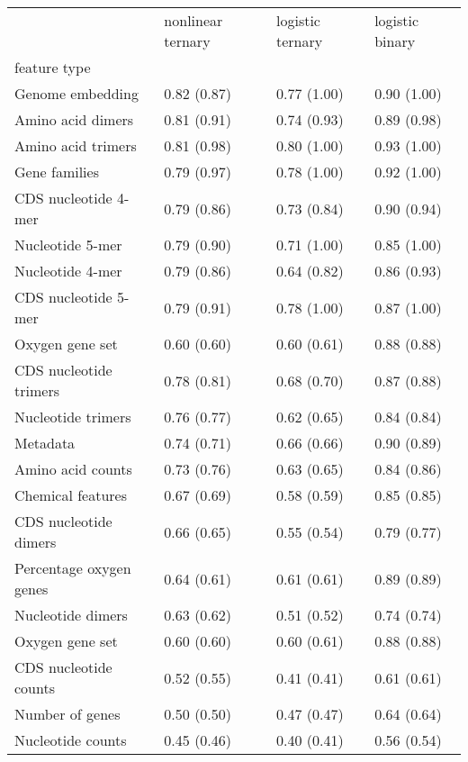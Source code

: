 \begin{tabular}{llll}
\toprule
 & nonlinear ternary & logistic ternary & logistic binary \\
feature type &  &  &  \\
\midrule
Genome embedding & 0.82 (0.87) & 0.77 (1.00) & 0.90 (1.00) \\
Amino acid dimers & 0.81 (0.91) & 0.74 (0.93) & 0.89 (0.98) \\
Amino acid trimers & 0.81 (0.98) & 0.80 (1.00) & 0.93 (1.00) \\
Gene families & 0.79 (0.97) & 0.78 (1.00) & 0.92 (1.00) \\
CDS nucleotide 4-mer & 0.79 (0.86) & 0.73 (0.84) & 0.90 (0.94) \\
Nucleotide 5-mer & 0.79 (0.90) & 0.71 (1.00) & 0.85 (1.00) \\
Nucleotide 4-mer & 0.79 (0.86) & 0.64 (0.82) & 0.86 (0.93) \\
CDS nucleotide 5-mer & 0.79 (0.91) & 0.78 (1.00) & 0.87 (1.00) \\
Oxygen gene set & 0.60 (0.60) & 0.60 (0.61) & 0.88 (0.88) \\
CDS nucleotide trimers & 0.78 (0.81) & 0.68 (0.70) & 0.87 (0.88) \\
Nucleotide trimers & 0.76 (0.77) & 0.62 (0.65) & 0.84 (0.84) \\
Metadata & 0.74 (0.71) & 0.66 (0.66) & 0.90 (0.89) \\
Amino acid counts & 0.73 (0.76) & 0.63 (0.65) & 0.84 (0.86) \\
Chemical features & 0.67 (0.69) & 0.58 (0.59) & 0.85 (0.85) \\
CDS nucleotide dimers & 0.66 (0.65) & 0.55 (0.54) & 0.79 (0.77) \\
Percentage oxygen genes & 0.64 (0.61) & 0.61 (0.61) & 0.89 (0.89) \\
Nucleotide dimers & 0.63 (0.62) & 0.51 (0.52) & 0.74 (0.74) \\
Oxygen gene set & 0.60 (0.60) & 0.60 (0.61) & 0.88 (0.88) \\
CDS nucleotide counts & 0.52 (0.55) & 0.41 (0.41) & 0.61 (0.61) \\
Number of genes & 0.50 (0.50) & 0.47 (0.47) & 0.64 (0.64) \\
Nucleotide counts & 0.45 (0.46) & 0.40 (0.41) & 0.56 (0.54) \\
\bottomrule
\end{tabular}
